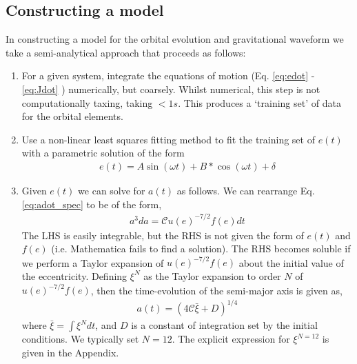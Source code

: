 \documentclass[a4paper,fleqn,usenatbib]{mnras}
\begin{document}
\subsection{Constructing a model}
In constructing a model for the orbital evolution and gravitational waveform we take a semi-analytical approach that proceeds as follows:
\begin{enumerate}
	\item For a given system, integrate the equations of motion (Eq. \ref{eq:edot} - \ref{eq:Jdot} ) numerically, but coarsely. Whilst numerical, this step is not computationally taxing, taking $< 1s$. This produces a `training set' of data for the orbital elements. \newline 
	
	\item \noindent Use a non-linear least squares fitting method to fit the training set of $e(t)$ with a parametric solution of the form
	\begin{eqnarray}
	e(t) = A \sin(\omega t) + B*\cos(\omega t)  + \delta
	\end{eqnarray}
	
	\item \noindent Given $e(t)$ we can solve for $a(t)$ as follows. We can rearrange Eq. \ref{eq:adot_spec} to be of the form,
	\begin{eqnarray}
	a^3 da = \mathcal C u (e)^{-7/2} f(e) dt 
	\end{eqnarray}
	The LHS is easily integrable, but the RHS is not given the form of $e(t)$ and $f(e)$ (i.e. Mathematica fails to find a solution). The RHS becomes soluble if we perform a Taylor expansion of $u(e)^{-7/2}f(e)$ about the initial value of the eccentricity. Defining $\xi^N$ as the Taylor expansion to order $N$ of $u(e)^{-7/2}f(e)$, then the time-evolution of the semi-major axis is given as,
	\begin{eqnarray}
	a(t) = (4 \mathcal{C} \bar{\xi} + D)^{1/4}
	\end{eqnarray}
	where $\bar{\xi} = \int \xi^N dt$, and $D$ is a constant of integration set by the initial conditions. We typically set $N = 12$. The explicit expression for $\xi^{N=12}$ is given in the Appendix. \newline 
	
	


\end{enumerate}
\end{document}
